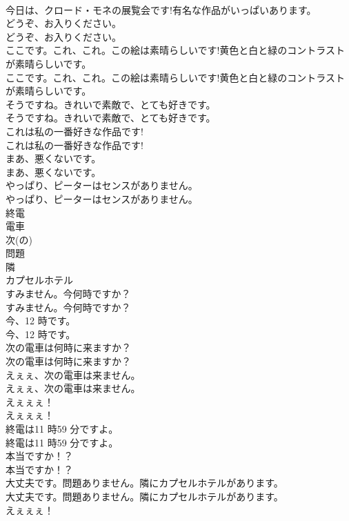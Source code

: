 \documentclass[8pt]{extreport}
\begin{document}
\begin{CJK}{UTF8}{min}
\\	今日は、クロード・モネの展覧会です!有名な作品がいっぱいあります。 
\\	どうぞ、お入りください。	
\\	どうぞ、お入りください。 
\\	ここです。これ、これ。この絵は素晴らしいです!黄色と白と緑のコントラストが素晴らしいです。	
\\	ここです。これ、これ。この絵は素晴らしいです!黄色と白と緑のコントラストが素晴らしいです。 
\\	そうですね。きれいで素敵で、とても好きです。	
\\	そうですね。きれいで素敵で、とても好きです。 
\\	これは私の一番好きな作品です!	
\\	これは私の一番好きな作品です! 
\\	まあ、悪くないです。	
\\	まあ、悪くないです。 
\\	やっぱり、ピーターはセンスがありません。	
\\	やっぱり、ピーターはセンスがありません。 
\\	終電
\\	電車
\\	次(の)
\\	問題
\\	隣
\\	カプセルホテル
\\	すみません。今何時ですか？	
\\	すみません。今何時ですか？ 
\\	今、12 時です。	
\\	今、12 時です。 
\\	次の電車は何時に来ますか？	
\\	次の電車は何時に来ますか？ 
\\	えぇぇ、次の電車は来ません。	
\\	えぇぇ、次の電車は来ません。 
\\	えぇぇぇ！	
\\	えぇぇぇ！ 
\\	終電は11 時59 分ですよ。	
\\	終電は11 時59 分ですよ。 
\\	本当ですか！？	
\\	本当ですか！？ 
\\	大丈夫です。問題ありません。隣にカプセルホテルがあります。	
\\	大丈夫です。問題ありません。隣にカプセルホテルがあります。 
\\	えぇぇぇ！	

\end{CJK}
\end{document}
